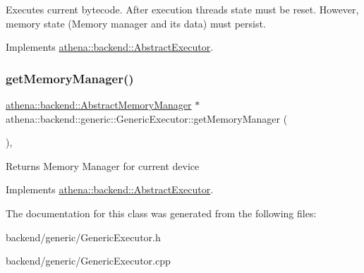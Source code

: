 Executes current bytecode. After execution threads state must be reset. However, memory state (Memory manager and its data) must persist. 

Implements \mbox{\hyperlink{classathena_1_1backend_1_1_abstract_executor_a5f179146ae76002b678a4862553f87ce}{athena\+::backend\+::\+Abstract\+Executor}}.

\mbox{\label{classathena_1_1backend_1_1generic_1_1_generic_executor_a0560a1dfc0c70ebef0b5be26bb82b9c5}} 
\subsubsection{\texorpdfstring{get\+Memory\+Manager()}{getMemoryManager()}}
{\footnotesize\ttfamily \mbox{\hyperlink{classathena_1_1backend_1_1_abstract_memory_manager}{athena\+::backend\+::\+Abstract\+Memory\+Manager}} $\ast$ athena\+::backend\+::generic\+::\+Generic\+Executor\+::get\+Memory\+Manager (\begin{DoxyParamCaption}{ }\end{DoxyParamCaption})\hspace{0.3cm}{\ttfamily [override]}, {\ttfamily [virtual]}}

\begin{DoxyReturn}{Returns}
Memory Manager for current device 
\end{DoxyReturn}


Implements \mbox{\hyperlink{classathena_1_1backend_1_1_abstract_executor_a6d61486e2a06500c9c0aa1e03a475e4a}{athena\+::backend\+::\+Abstract\+Executor}}.



The documentation for this class was generated from the following files\+:\begin{DoxyCompactItemize}
\item 
backend/generic/Generic\+Executor.\+h\item 
backend/generic/Generic\+Executor.\+cpp\end{DoxyCompactItemize}
